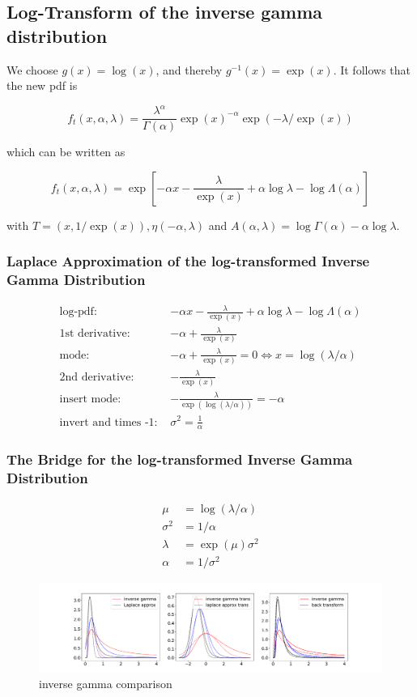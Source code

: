 \subsection{Log-Transform of the inverse gamma distribution}

We choose $g(x) = \log(x)$, and thereby $g^{-1}(x) = \exp(x)$. It follows that the new pdf is 

\begin{equation}
	f_t(x, \alpha, \lambda) = \frac{\lambda^{\alpha}}{\Gamma(\alpha)} \exp(x)^{-\alpha} \exp(-\lambda/\exp(x))
	\label{eq:inv_gamma_trans_pdf}
\end{equation}

which can be written as 

\begin{equation}
	f_t(x, \alpha, \lambda) = \exp \left[-\alpha x - \frac{\lambda}{\exp(x)} + \alpha \log \lambda - \log\Lambda(\alpha)\right]
\end{equation}

with $T=(x, 1/\exp(x)), \eta(-\alpha, \lambda)$ and $A(\alpha, \lambda) = \log\Gamma(\alpha) - \alpha \log \lambda$.

\subsubsection{Laplace Approximation of the log-transformed Inverse Gamma Distribution}


\begin{align*}
\text{log-pdf: } &-\alpha x - \frac{\lambda}{\exp(x)} + \alpha \log \lambda - \log\Lambda(\alpha) \\
\text{1st derivative: }&  -\alpha + \frac{\lambda}{\exp(x)}\\
\text{mode: }&  -\alpha + \frac{\lambda}{\exp(x)} = 0 \Leftrightarrow x = \log(\lambda/\alpha)\\
\text{2nd derivative: }&  -\frac{\lambda}{\exp(x)}\\
\text{insert mode: }&  -\frac{\lambda}{\exp(\log(\lambda/\alpha))} = -\alpha\\
\text{invert and times -1: }&\sigma^2 = \frac{1}{\alpha}
\end{align*}

\subsubsection{The Bridge for the log-transformed Inverse Gamma Distribution}

\begin{align}
	\mu &= \log(\lambda/\alpha) \\
	\sigma^2 &= 1/\alpha \\
	\lambda &= \exp(\mu) \sigma^2 \\
	\alpha &= 1/\sigma^2
\end{align}

\begin{figure}
	\centering
	\includegraphics[width=\textwidth]{figures/inverse_gamma_playground.pdf}
	\caption{inverse gamma comparison}
	\label{fig:inverse_gamma_comparison}
\end{figure}